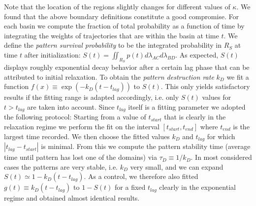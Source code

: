 \documentclass[a4paper,10pt]{article}
\newcommand{\Hb}{{\it Hb}\xspace}
\newcommand{\Kr}{{\it Kr}\xspace}
\newcommand{\Kni}{{\it Kni}\xspace}
\newcommand{\Gt}{{\it Gt}\xspace}
\begin{document}

Note that the location of the regions slightly changes for different values of $\kappa$.
We found that the above boundary definitions constitute a good compromise.
For each basin we compute the fraction of total probability as a function of time by integrating the weights of
trajectories that are within the basin at time $t$.
We define the \emph{pattern survival probability} to be the integrated probability in $R_S$ at time $t$ after initialization:
$S(t)=\iint_{R_S} p(t) d\lambda_{AC} d\lambda_{BD}$.
As expected, $S(t)$ displays roughly exponential decay behavior after a certain lag phase that can be attributed to initial relaxation.
To obtain the \emph{pattern destruction rate} $k_D$ we fit a function $f(x)\equiv \exp(-k_D(t-t_{lag}))$ to $S(t)$.
This only yields satisfactory results if the fitting range is adapted accordingly, i.e. only $S(t)$ values for $t>t_{lag}$ are taken into account.
Since $t_{lag}$ itself is a fitting parameter we adopted the following protocol:
Starting from a value of $t_{start}$ that is clearly in the relaxation regime we perform the fit on the interval $[t_{start}, t_{end}]$
where $t_{end}$ is the largest time recorded.
We then choose the fitted values $k_D$ and $t_{lag}$ for which $|t_{lag}-t_{start}|$ is minimal.
From this we compute the pattern stability time (average time until pattern has lost one of the domains) via $\tau_D \equiv 1/k_D$.
In most considered cases the patterns are very stable, i.e. $k_D$ very small, and we can expand
$S(t)\simeq 1 - k_D(t-t_{lag})$.
As a control, we therefore also fitted $g(t)\equiv k_D(t-t_{lag})$ to $1-S(t)$ for a fixed $t_{lag}$ clearly in the
exponential regime and obtained almost identical results.
\end{document}
